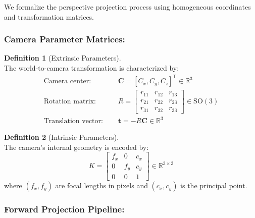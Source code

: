 \documentclass[12pt]{article}
\newcommand{\R}{\mathbb{R}}
\newcommand{\vect}[1]{\bm{#1}}
\theoremstyle{definition}
\newtheorem{definition}{Definition}[subsection]
\begin{document}
We formalize the perspective projection process using homogeneous coordinates and transformation matrices.

\subsubsection*{Camera Parameter Matrices:}

\begin{definition}[Extrinsic Parameters] ~\\
The world-to-camera transformation is characterized by:
\begin{align}
\text{Camera center: } &\quad \vect{C} = [C_x, C_y, C_z]^\mathsf{T} \in \R^3 \\
\text{Rotation matrix: } &\quad R = \begin{bmatrix}
    r_{11} & r_{12} & r_{13} \\
    r_{21} & r_{22} & r_{23} \\
    r_{31} & r_{32} & r_{33}
\end{bmatrix} \in \text{SO}(3) \\
\text{Translation vector: } &\quad \vect{t} = -R \vect{C} \in \R^3
\end{align}
\end{definition}

\begin{definition}[Intrinsic Parameters] ~\\
The camera's internal geometry is encoded by:
\begin{equation}
K = \begin{bmatrix}
    f_x & 0 & c_x \\
    0 & f_y & c_y \\
    0 & 0 & 1
\end{bmatrix} \in \R^{3 \times 3} \label{eq:intrinsic}
\end{equation}
where $(f_x, f_y)$ are focal lengths in pixels and $(c_x, c_y)$ is the principal point.
\end{definition}

\subsubsection*{Forward Projection Pipeline:}
\end{document}
